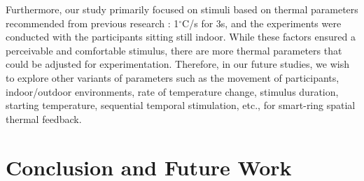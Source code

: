 \documentclass[preprint,12pt]{elsarticle}
\begin{document}
Furthermore, our study primarily focused on stimuli based on thermal parameters recommended from previous research \cite{42}: 1$^{\circ}$C/s for 3s, and the experiments were conducted with the participants sitting still indoor. While these factors ensured a perceivable and comfortable stimulus, there are more thermal parameters that could be adjusted for experimentation. Therefore, in our future studies, we wish to explore other variants of parameters such as the movement of participants, indoor/outdoor environments, rate of temperature change, stimulus duration, starting temperature, sequential temporal stimulation, etc., for smart-ring spatial thermal feedback.

\section{Conclusion and Future Work}
\end{document}
